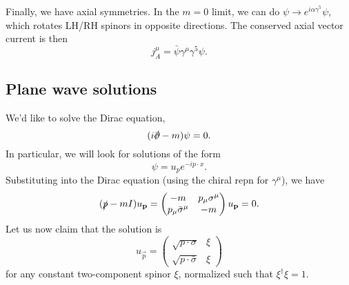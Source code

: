 Finally, we have axial symmetries. In the $m=0$ limit, we can do $\psi \to e^{i\alpha \gamma^5} \psi$, which rotates LH/RH spinors in opposite directions. The conserved axial vector current is then
$$j^\mu_A =\bar \psi \gamma^\mu \gamma^5 \psi.$$

\subsection*{Plane wave solutions} We'd like to solve the Dirac equation,
$$(i\slashed{\p}-m)\psi=0.$$
In particular, we will look for solutions of the form
$$\psi = u_p e^{-ip\cdot x}.$$
Substituting into the Dirac equation (using the chiral repn for $\gamma^\mu$), we have
\begin{equation}\label{diracplanewave}
(\slashed{p}-m I)u_{\vec p} = \begin{pmatrix} -m & p_\mu \sigma^\mu \\
p_\mu \bar \sigma^\mu & -m
\end{pmatrix} u_{\vec p} =0.
\end{equation}
Let us now claim that the solution is
$$u_{\vec p}=\begin{pmatrix}
    \sqrt{p\cdot \sigma} & \xi\\
    \sqrt{p\cdot \bar \sigma} & \xi
\end{pmatrix}$$
for any constant two-component spinor $\xi$, normalized such that $\xi^\dagger \xi =1$.

